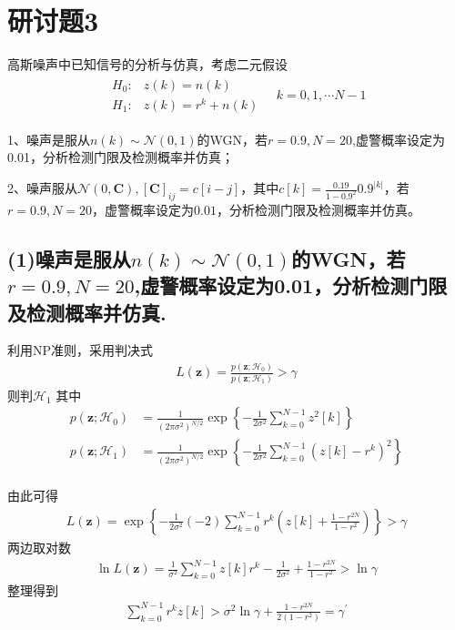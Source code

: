 \documentclass[fontset=windows]{article}
\numberwithin{figure}{section}
\begin{document}
\section{研讨题3}

高斯噪声中已知信号的分析与仿真，考虑二元假设
\begin{align*}
    \begin{matrix}
        H_0: & z(k)=n(k)     \\
        H_1: & z(k)=r^k+n(k)
    \end{matrix}\quad k=0,1,\cdots N-1
\end{align*}

1、噪声是服从\(n(k)\sim \mathcal{N}(0,1)\)的WGN，若\(r=0.9,N=20\),虚警概率设定为0.01，分析检测门限及检测概率并仿真；

2、噪声服从\(\mathcal{N}(0,\mathbf{C}),[\mathbf{C}]_{ij}=c[i-j]\)，其中\(c[k]=\frac{0.19}{1-0.9^2}0.9^{|k|}\)，若\(r=0.9,N=20\)，虚警概率设定为\(0.01\)，分析检测门限及检测概率并仿真。

\subsection*{(1)噪声是服从\(n(k)\sim \mathcal{N}(0,1)\)的WGN，若\(r=0.9,N=20\),虚警概率设定为0.01，分析检测门限及检测概率并仿真.}

利用NP准则，采用判决式
\begin{align*}
    L(\mathbf{z})=\frac{p(\mathbf{z};\mathcal{H}_0)}{p(\mathbf{z};\mathcal{H}_1)}>\gamma
\end{align*}
则判\(\mathcal{H}_1\)
其中
\begin{align*}
    p(\mathbf{z};\mathcal{H}_0)
     & =\frac{1}{(2\pi\sigma^2)^{N/2}}\exp\left\{-\frac{1}{2\sigma^2}\sum_{k=0}^{N-1}z^2[k]\right\}       \\
    p(\mathbf{z};\mathcal{H}_1)
     & =\frac{1}{(2\pi\sigma^2)^{N/2}}\exp\left\{-\frac{1}{2\sigma^2}\sum_{k=0}^{N-1}(z[k]-r^k)^2\right\} \\
\end{align*}

由此可得
\begin{align*}
    L(\mathbf{z})=\exp\left\{-\frac{1}{2\sigma^2}(-2)\sum_{k=0}^{N-1}r^k(z[k]+\frac{1-r^{2N}}{1-r^2})\right\}>\gamma
\end{align*}
两边取对数
\begin{align*}
    \ln L(\mathbf{z})=\frac{1}{\sigma^2}\sum_{k=0}^{N-1}z[k]r^k-\frac{1}{2\sigma^2}+\frac{1-r^{2N}}{1-r^2}>\ln\gamma
\end{align*}
整理得到
\begin{align*}
    \sum_{k=0}^{N-1}r^kz[k]>\sigma^2 \ln \gamma+\frac{1-r^{2N}}{2(1-r^2)}=\gamma^{\prime}
\end{align*}
\end{document}
